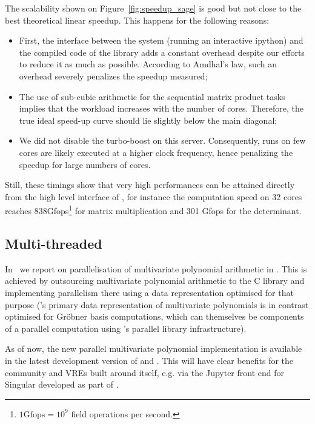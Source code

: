 \documentclass{deliverablereport}
\begin{document}
The scalability shown on Figure~\ref{fig:speedup_sage} is good but not close to the best theoretical linear
speedup. This happens for the following reasons:
\begin{itemize}
\item First, the interface between the system \SageMath (running an interactive ipython) and the compiled code of the
  library adds a constant overhead despite our efforts to reduce it as much as possible. According to Amdhal's law,
  such an overhead severely penalizes the speedup measured;
\item The use of sub-cubic arithmetic for the sequential matrix product tasks implies that the workload increases with
  the number of cores. Therefore, the true ideal speed-up curve should lie slightly below the main diagonal;
\item We did not disable the turbo-boost on this server. Consequently, runs on few cores are likely executed at a higher
  clock frequency, hence penalizing the speedup for large numbers of cores.
\end{itemize}

Still, these timings show that very high performances can be attained directly from the high level interface of
\SageMath, for instance the computation speed on 32 cores reaches 838Gfops\footnote{$1\text{Gfops} = 10^9$ field
  operations per second.} for matrix multiplication and 301 Gfops for
the determinant.

\subsection{Multi-threaded \Singular}

In~ we report on parallelisation of
multivariate polynomial arithmetic in \Singular. This is achieved by
outsourcing multivariate polynomial arithmetic to the C \FLINT library
and implementing parallelism there using a data representation
optimised for that purpose (\Singular's primary data representation of
multivariate polynomials is in contrast optimised for Gr\"{o}bner basis
computations, which can themselves be components of a parallel computation
using \Singular's parallel library infrastructure).

As of now, the new parallel multivariate polynomial implementation is available in the
latest development version of \FLINT and \Singular. This will have clear benefits for the
\Singular community and VREs built around \Singular itself, e.g. via the Jupyter front end
for Singular developed as part of .
\end{document}
